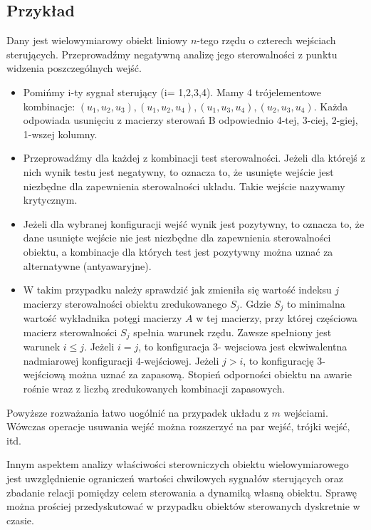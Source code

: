 \documentclass{article}
\begin{document}
		\subsection{Przykład}
			Dany jest wielowymiarowy obiekt liniowy $n$-tego rzędu 
			o czterech wejściach sterujących.
			Przeprowadźmy negatywną analizę jego sterowalności 
			z punktu widzenia poszczególnych wejść.
			\begin{itemize}
				\item Pomińmy i-ty sygnał sterujący (i= 1,2,3,4).
					Mamy 4 trójelementowe kombinacje: 
					$(u_1 , u_2 , u_3), (u_1 , u_2 , u_4), (u_1 , u_3 , u_4) ,
					(u_2 , u_3 , u_4)$. Każda odpowiada usunięciu z macierzy
					sterowań B odpowiednio 4-tej, 3-ciej, 2-giej, 1-wszej kolumny.
				\item Przeprowadźmy dla każdej z kombinacji test sterowalności.
					Jeżeli dla którejś z nich
					wynik testu jest negatywny, to oznacza to,
					że usunięte wejście jest niezbędne dla
					zapewnienia sterowalności układu.
					Takie wejście nazywamy krytycznym.
				\item Jeżeli dla wybranej konfiguracji wejść wynik jest pozytywny,
					to oznacza to, że dane
					usunięte wejście nie jest niezbędne dla zapewnienia
					sterowalności obiektu, a kombinacje
					dla których test jest pozytywny można uznać
					za alternatywne (antyawaryjne).
				\item W takim przypadku należy sprawdzić jak zmieniła
					się wartość indeksu $j$ macierzy
					sterowalności obiektu zredukowanego $S_j$.
					Gdzie $S_j$ to
					minimalna wartość wykładnika potęgi
					macierzy $A$ w tej macierzy, przy której częściowa 
					macierz sterowalności $S_j$ spełnia
					warunek rzędu. Zawsze spełniony jest warunek $i\leq j$.
					Jeżeli $i=j$, to konfiguracja 3-
					wejsciowa jest ekwiwalentna nadmiarowej konfiguracji 
					4-wejściowej. Jeżeli $j > i$,
					to konfigurację 3-wejściową można uznać za
					zapasową. Stopień odporności 
					obiektu na awarie 
					rośnie wraz z liczbą zredukowanych kombinacji zapasowych.
			\end{itemize}
			Powyższe rozważania łatwo uogólnić na przypadek układu z $m$ wejściami. Wówczas
			operacje usuwania wejść można rozszerzyć na par wejść, trójki wejść, itd.

			Innym aspektem analizy właściwości sterowniczych obiektu wielowymiarowego jest
			uwzględnienie ograniczeń wartości chwilowych sygnałów sterujących oraz zbadanie
			relacji pomiędzy celem sterowania a dynamiką własną obiektu. Sprawę można prościej
			przedyskutować w przypadku obiektów sterowanych dyskretnie w czasie.
\end{document}

